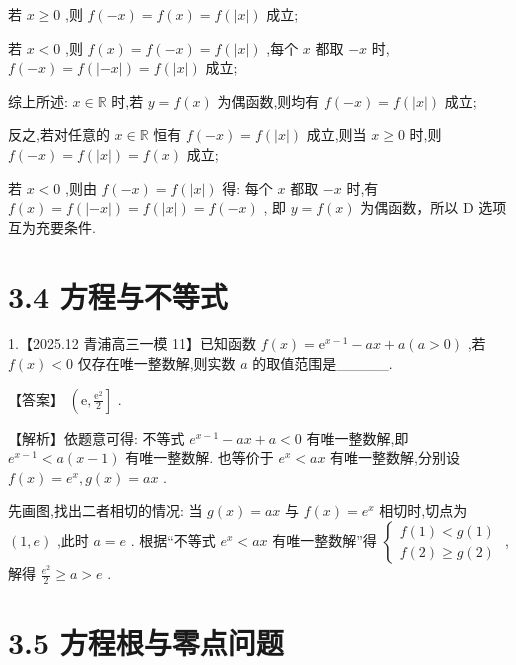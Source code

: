 \documentclass[10pt]{article}
\begin{document}
若 \(x \geq  0\) ,则 \(f\left( {-x}\right)  = f\left( x\right)  = f\left( \left| x\right| \right)\) 成立;

若 \(x < 0\) ,则 \(f\left( x\right)  = f\left( {-x}\right)  = f\left( \left| x\right| \right)\) ,每个 \(x\) 都取 \(- x\) 时, \(f\left( {-x}\right)  = f\left( \left| {-x}\right| \right)  = f\left( \left| x\right| \right)\) 成立;

综上所述: \(x \in  \mathbb{R}\) 时,若 \(y = f\left( x\right)\) 为偶函数,则均有 \(f\left( {-x}\right)  = f\left( \left| x\right| \right)\) 成立;

反之,若对任意的 \(x \in  \mathbb{R}\) 恒有 \(f\left( {-x}\right)  = f\left( \left| x\right| \right)\) 成立,则当 \(x \geq  0\) 时,则 \(f\left( {-x}\right)  = f\left( \left| x\right| \right)  = f\left( x\right)\) 成立;

若 \(x < 0\) ,则由 \(f\left( {-x}\right)  = f\left( \left| x\right| \right)\) 得: 每个 \(x\) 都取 \(- x\) 时,有 \(f\left( x\right)  = f\left( \left| {-x}\right| \right)  = f\left( \left| x\right| \right)  = f\left( {-x}\right)\) , 即 \(y = f\left( x\right)\) 为偶函数，所以 D 选项互为充要条件.

\section*{3.4 方程与不等式}

1.【2025.12 青浦高三一模 11】已知函数 \(f\left( x\right)  = {\mathrm{e}}^{x - 1} - {ax} + a\left( {a > 0}\right)\) ,若 \(f\left( x\right)  < 0\) 仅存在唯一整数解,则实数 \(a\) 的取值范围是\_\_\_\_\_.

【答案】 \(\left( {\mathrm{e},\frac{{\mathrm{e}}^{2}}{2}}\right\rbrack\) .

【解析】依题意可得: 不等式 \({e}^{x - 1} - {ax} + a < 0\) 有唯一整数解,即 \({e}^{x - 1} < a\left( {x - 1}\right)\) 有唯一整数解. 也等价于 \({e}^{x} < {ax}\) 有唯一整数解,分别设 \(f\left( x\right)  = {e}^{x},g\left( x\right)  = {ax}\) .

先画图,找出二者相切的情况: 当 \(g\left( x\right)  = {ax}\) 与 \(f\left( x\right)  = {e}^{x}\) 相切时,切点为 \(\left( {1,e}\right)\) ,此时 \(a = e\) . 根据“不等式 \({e}^{x} < {ax}\) 有唯一整数解”得 \(\left\{  \begin{array}{l} f\left( 1\right)  < g\left( 1\right) \\  f\left( 2\right)  \geq  g\left( 2\right)  \end{array}\right.\) ,解得 \(\frac{{e}^{2}}{2} \geq  a > e\) .

\section*{3.5 方程根与零点问题}
\end{document}
